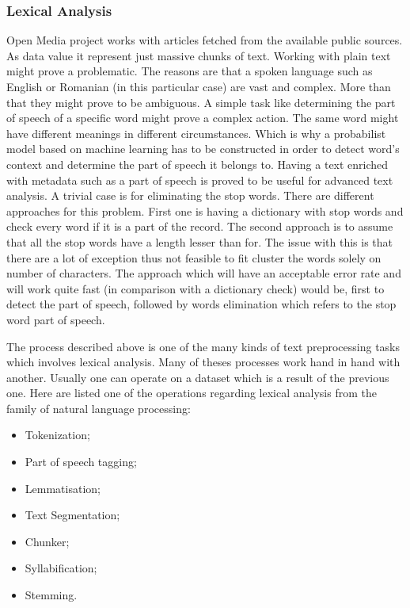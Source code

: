 \subsubsection{Lexical Analysis}
Open Media project works with articles fetched from the available public sources. As data value it represent just massive chunks of text. Working with plain text might prove a problematic. The reasons are that a spoken language such as English or Romanian (in this particular case) are vast and complex. More than that they might prove to be ambiguous. A simple task like determining the part of speech of a specific word might prove a complex action. The same word might have different meanings in different circumstances. Which is why a probabilist model based on machine learning has to be constructed in order to detect word's context and determine the part of speech it belongs to. Having a text enriched with metadata such as a part of speech is proved to be useful for advanced text analysis. A trivial case is for eliminating the stop words. There are different approaches for this problem. First one is having a dictionary with stop words and check every word if it is a part of the record. The second approach is to assume that all the stop words have a length lesser than for. The issue with this is that there are a lot of exception thus not feasible to fit cluster the words solely on number of characters. The approach which will have an acceptable error rate and will work quite fast (in comparison with a dictionary check) would be, first to detect the part of speech, followed by words elimination which refers to the stop word part of speech.

The process described above is one of the many kinds of text preprocessing tasks which involves lexical analysis. Many of theses processes work hand in hand with another. Usually one can operate on a dataset which is a result of the previous one. Here are listed one of the operations regarding lexical analysis from the family of natural language processing:
\begin{itemize}
    \item Tokenization;
    \item Part of speech tagging;
    \item Lemmatisation;
    \item Text Segmentation;
    \item Chunker;
    \item Syllabification;
    \item Stemming.
\end{itemize}

